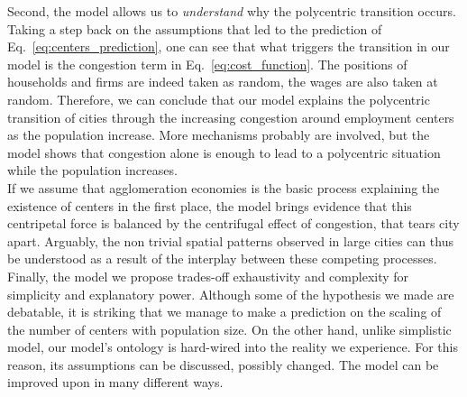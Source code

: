 Second, the model allows us to \emph{understand} why the polycentric transition
occurs. Taking a step back on the assumptions that led to the prediction of
Eq.~\ref{eq:centers_prediction}, one can see that what triggers the transition
in our model is the congestion term in Eq.~\ref{eq:cost_function}. The positions
of households and firms are indeed taken as random, the wages are also taken at
random. Therefore, we can conclude that our model explains the polycentric
transition of cities through the increasing congestion around employment centers
as the population increase. More mechanisms probably are involved, but the model
shows that congestion alone is enough to lead to a polycentric situation while
the population increases.\\

If we assume that agglomeration economies is the basic process explaining the
existence of centers in the first place, the model brings evidence that this
centripetal force is balanced by the centrifugal effect of congestion, that
tears city apart. Arguably, the non trivial spatial patterns observed in large cities can
thus be understood as a result of the interplay between these competing
processes.\\

Finally, the model we propose trades-off exhaustivity and complexity for simplicity and
explanatory power. Although some of the hypothesis we made are debatable, it is
striking that we manage to make a prediction on the scaling of the number of
centers with population size. On the other hand, unlike simplistic model, our
model's ontology is hard-wired into the reality we experience. For this reason,
its assumptions can be discussed, possibly changed. The model can be improved
upon in many different ways.
